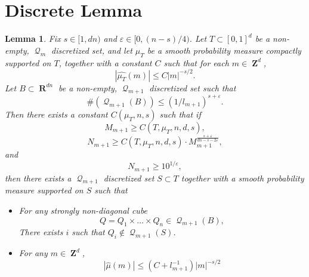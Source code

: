 \documentclass[12pt,reqno]{amsart}
\newtheorem{lemma}[theorem]{Lemma}
\DeclareMathOperator{\RR}{\mathbf{R}}
\DeclareMathOperator{\ZZ}{\mathbf{Z}}
\DeclareMathOperator{\DQ}{\mathcal{Q}}
\begin{document}
\section{Discrete Lemma}

\begin{lemma}
	Fix $s \in [1,dn)$ and $\varepsilon \in [0,(n-s)/4)$. Let $T \subset [0,1]^d$ be a non-empty, $\DQ_m$ discretized set, and let $\mu_T$ be a smooth probability measure compactly supported on $T$, together with a constant $C$ such that for each $m \in \ZZ^d$,
    \[ |\widehat{\mu_T}(m)| \leq C |m|^{-s/2}. \]
    Let $B \subset \RR^{dn}$ be a non-empty, $\DQ_{m+1}$ discretized set such that
	\[ \#(\DQ_{m+1}(B)) \leq (1/l_{m+1})^{s + \varepsilon}. \]
	Then there exists a constant $C(\mu_T,n,s)$ such that if
    \begin{equation} \label{equation1095121284102}
        M_{m+1} \geq C(T,\mu_T,n,d,s),
    \end{equation}
    \begin{equation} \label{equation5890129048128941891}
        N_{m+1} \geq C(T,\mu_T,n,d,s) \cdot M_{m+1}^{\frac{s + \varepsilon}{dn - s - 2\varepsilon}},
    \end{equation}
    and
    \begin{equation} \label{equation12904190251290590120129}
        N_{m+1} \geq 10^{1/\varepsilon},
    \end{equation}
    then there exists a $\DQ_{m+1}$ discretized set $S \subset T$ together with a smooth probability measure supported on $S$ such that
	\begin{itemize}
		\item For any strongly non-diagonal cube
		\[ Q = Q_1 \times \dots \times Q_n \in \DQ_{m+1}(B), \]
		There exists $i$ such that $Q_i \not \in \DQ_{m+1}(S)$.

		\item For any $m \in \ZZ^d$,
		\[ |\widehat{\mu}(m)| \leq (C + l_{m+1}^{-1}) |m|^{-s/2} \]
	\end{itemize}
\end{lemma}
\end{document}
